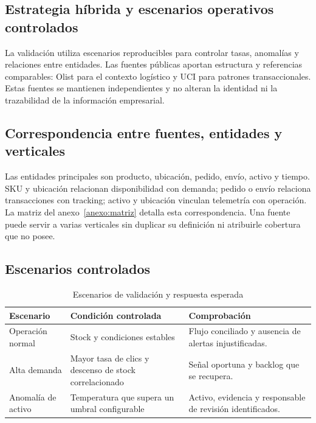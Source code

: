 \documentclass[11pt,a4paper]{article}
\begin{document}
\subsection{Estrategia híbrida y escenarios operativos controlados}
La validación utiliza escenarios reproducibles para controlar tasas, anomalías y relaciones entre entidades. Las fuentes públicas aportan estructura y referencias comparables: Olist para el contexto logístico y UCI para patrones transaccionales. Estas fuentes se mantienen independientes y no alteran la identidad ni la trazabilidad de la información empresarial.
\LuminaFuentes

\subsection{Correspondencia entre fuentes, entidades y verticales}
Las entidades principales son producto, ubicación, pedido, envío, activo y tiempo. SKU y ubicación relacionan disponibilidad con demanda; pedido o envío relaciona transacciones con tracking; activo y ubicación vinculan telemetría con operación. La matriz del anexo~\ref{anexo:matriz} detalla esta correspondencia. Una fuente puede servir a varias verticales sin duplicar su definición ni atribuirle cobertura que no posee.

\subsection{Escenarios controlados}
\begin{table}[H]
\caption{Escenarios de validación y respuesta esperada}\label{tab:escenarios}
\small\begin{tabularx}{\linewidth}{@{}P{.21\linewidth}YY@{}}\toprule
Escenario & Condición controlada & Comprobación\\\midrule
Operación normal & Stock y condiciones estables & Flujo conciliado y ausencia de alertas injustificadas.\\
Alta demanda & Mayor tasa de clics y descenso de stock correlacionado & Señal oportuna y backlog que se recupera.\\
Anomalía de activo & Temperatura que supera un umbral configurable & Activo, evidencia y responsable de revisión identificados.\\\bottomrule
\end{tabularx}
\end{table}
\end{document}
